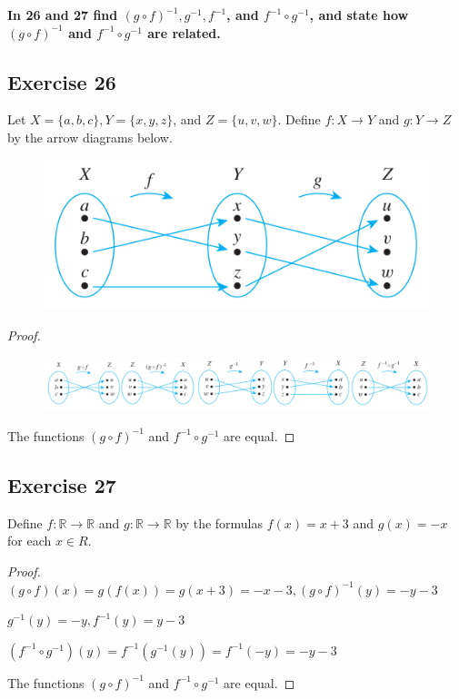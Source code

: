 \documentclass[14pt]{extarticle}
\newcommand{\R}{\mathbb{R}}
\newcommand{\cy}{\color{cyan}}
\begin{document}
{\bf \cy In 26 and 27 find \((g \circ f)^{-1}, g^{-1}, f^{-1}\), and \(f^{-1} \circ g^{-1}\), and state how 
\((g \circ f)^{-1}\) and \(f^{-1} \circ g^{-1}\) are related.}

\subsection{Exercise 26}
Let \(X = \{a, b, c\}, Y = \{x, y, z\}\), and \(Z = \{u, v, w\}\). Define \(f: X \to Y\) and \(g: Y \to Z\) by the 
arrow diagrams below.

\begin{figure}[ht!]
\centering
\includegraphics[scale=0.5]{../images/7.3.26.png}
\end{figure}

\begin{proof}
\begin{figure}[ht!]
\centering
\includegraphics[scale=0.4]{../images/7.3.26.sol.png}
\end{figure}

The functions \((g \circ f)^{-1}\) and \(f^{-1} \circ g^{-1}\) are equal.
\end{proof}

\subsection{Exercise 27}
Define \(f: \R \to \R\) and \(g: \R \to \R\) by the formulas \(f(x) = x + 3\) and \(g(x) = -x\) for each \(x \in R\).

\begin{proof}
\((g \circ f)(x) = g(f(x)) = g(x+3) = -x-3, (g \circ f)^{-1}(y) = -y-3\)

\(g^{-1}(y) = -y, f^{-1}(y) = y - 3\)

\((f^{-1} \circ g^{-1})(y) = f^{-1}(g^{-1}(y)) = f^{-1}(-y) = -y-3\)

The functions \((g \circ f)^{-1}\) and \(f^{-1} \circ g^{-1}\) are equal.
\end{proof}
\end{document}
